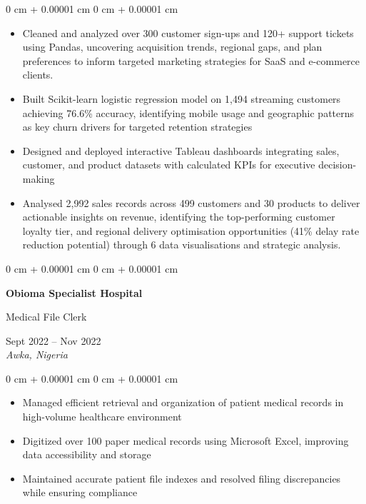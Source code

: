 \documentclass[10pt, a4paper]{article}
\newenvironment{highlights}{
    \begin{itemize}[
        topsep=0.10 cm,
        parsep=0.10 cm,
        partopsep=0pt,
        itemsep=0pt,
        leftmargin=20pt
    ]
}{
    \end{itemize}
} %
\newenvironment{onecolentry}{
    \begin{adjustwidth}{
        0 cm + 0.00001 cm
    }{
        0 cm + 0.00001 cm
    }
}{
    \end{adjustwidth}
} %
\newenvironment{twocolentry}[2][]{
    \onecolentry
    \def\secondColumn{#2}
    \setcolumnwidth{\fill, 4.5 cm}
    \begin{paracol}{2}
}{
    \switchcolumn \raggedleft \secondColumn
    \end{paracol}
    \endonecolentry
} %
\begin{document}
    \vspace{0.10 cm}
    \begin{onecolentry}
        \begin{highlights}
            \item Cleaned and analyzed over 300 customer sign-ups and 120+ support tickets using Pandas, uncovering acquisition trends, regional gaps, and plan preferences to inform targeted marketing strategies for SaaS and e-commerce clients.
            \item Built Scikit-learn logistic regression model on 1,494 streaming customers achieving 76.6\% accuracy, identifying mobile usage and geographic patterns as key churn drivers for targeted retention strategies
            \item Designed and deployed interactive Tableau dashboards integrating sales, customer, and product datasets with calculated KPIs for executive decision-making
            \item Analysed 2,992 sales records across 499 customers and 30 products to deliver actionable insights on revenue, identifying the top-performing customer loyalty tier, and regional delivery optimisation opportunities (41\% delay rate reduction potential) through 6 data visualisations and strategic analysis.
        \end{highlights}
    \end{onecolentry}

    \vspace{0.15 cm}

    \begin{twocolentry}{
        Sept 2022 -- Nov 2022 \\
        \textit{Awka, Nigeria}
    }
        \textbf{Obioma Specialist Hospital}
        
        Medical File Clerk
    \end{twocolentry}

    \vspace{0.08 cm}
    \begin{onecolentry}
        \begin{highlights}
            \item Managed efficient retrieval and organization of patient medical records in high-volume healthcare environment
            \item Digitized over 100 paper medical records using Microsoft Excel, improving data accessibility and storage
            \item Maintained accurate patient file indexes and resolved filing discrepancies while ensuring compliance
        \end{highlights}
    \end{onecolentry}
\end{document}
